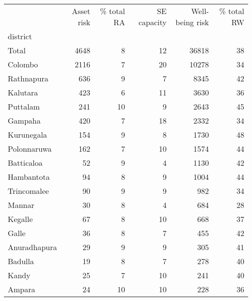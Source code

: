 \begin{tabular}{lrrrrr}
\toprule
{} &  Asset risk &  \% total RA &  SE capacity &  Well-being risk &  \% total RW \\
district     &             &             &              &                  &             \\
\midrule
Total        &        4648 &           8 &           12 &            36818 &          38 \\
Colombo      &        2116 &           7 &           20 &            10278 &          34 \\
Rathnapura   &         636 &           9 &            7 &             8345 &          42 \\
Kalutara     &         423 &           6 &           11 &             3630 &          36 \\
Puttalam     &         241 &          10 &            9 &             2643 &          45 \\
Gampaha      &         420 &           7 &           18 &             2332 &          34 \\
Kurunegala   &         154 &           9 &            8 &             1730 &          48 \\
Polonnaruwa  &         162 &           7 &           10 &             1574 &          44 \\
Batticaloa   &          52 &           9 &            4 &             1130 &          42 \\
Hambantota   &          94 &           8 &            9 &             1004 &          44 \\
Trincomalee  &          90 &           9 &            9 &              982 &          34 \\
Mannar       &          30 &           8 &            4 &              684 &          28 \\
Kegalle      &          67 &           8 &           10 &              668 &          37 \\
Galle        &          36 &           8 &            7 &              455 &          42 \\
Anuradhapura &          29 &           9 &            9 &              305 &          41 \\
Badulla      &          19 &           8 &            7 &              278 &          40 \\
Kandy        &          25 &           7 &           10 &              241 &          40 \\
Ampara       &          24 &          10 &           10 &              228 &          36 \\

\end{tabular}
